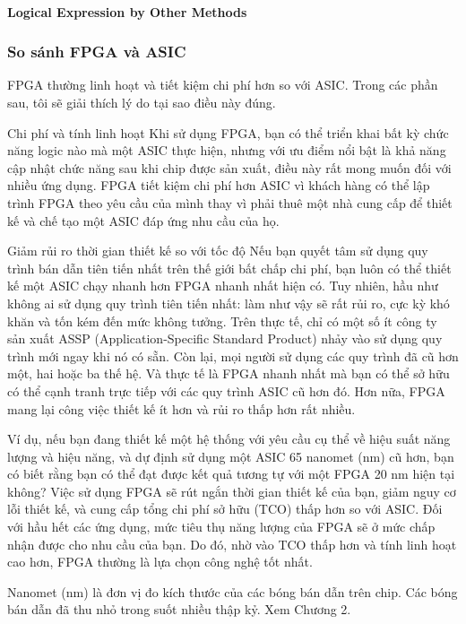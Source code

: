 \documentclass[a4paper]{article}
\begin{document}
\paragraph{Logical Expression by Other Methods}

\subsubsection{So sánh FPGA và ASIC}
FPGA thường linh hoạt và tiết kiệm chi phí hơn so với ASIC. Trong các phần sau, tôi sẽ giải thích lý do tại sao điều này đúng.

Chi phí và tính linh hoạt
Khi sử dụng FPGA, bạn có thể triển khai bất kỳ chức năng logic nào mà một ASIC thực hiện, nhưng với ưu điểm nổi bật là khả năng cập nhật chức năng sau khi chip được sản xuất, điều này rất mong muốn đối với nhiều ứng dụng. FPGA tiết kiệm chi phí hơn ASIC vì khách hàng có thể lập trình FPGA theo yêu cầu của mình thay vì phải thuê một nhà cung cấp để thiết kế và chế tạo một ASIC đáp ứng nhu cầu của họ.

Giảm rủi ro thời gian thiết kế so với tốc độ
Nếu bạn quyết tâm sử dụng quy trình bán dẫn tiên tiến nhất trên thế giới bất chấp chi phí, bạn luôn có thể thiết kế một ASIC chạy nhanh hơn FPGA nhanh nhất hiện có. Tuy nhiên, hầu như không ai sử dụng quy trình tiên tiến nhất: làm như vậy sẽ rất rủi ro, cực kỳ khó khăn và tốn kém đến mức không tưởng. Trên thực tế, chỉ có một số ít công ty sản xuất ASSP (Application-Specific Standard Product) nhảy vào sử dụng quy trình mới ngay khi nó có sẵn. Còn lại, mọi người sử dụng các quy trình đã cũ hơn một, hai hoặc ba thế hệ. Và thực tế là FPGA nhanh nhất mà bạn có thể sở hữu có thể cạnh tranh trực tiếp với các quy trình ASIC cũ hơn đó. Hơn nữa, FPGA mang lại công việc thiết kế ít hơn và rủi ro thấp hơn rất nhiều.

Ví dụ, nếu bạn đang thiết kế một hệ thống với yêu cầu cụ thể về hiệu suất năng lượng và hiệu năng, và dự định sử dụng một ASIC 65 nanomet (nm) cũ hơn, bạn có biết rằng bạn có thể đạt được kết quả tương tự với một FPGA 20 nm hiện tại không? Việc sử dụng FPGA sẽ rút ngắn thời gian thiết kế của bạn, giảm nguy cơ lỗi thiết kế, và cung cấp tổng chi phí sở hữu (TCO) thấp hơn so với ASIC. Đối với hầu hết các ứng dụng, mức tiêu thụ năng lượng của FPGA sẽ ở mức chấp nhận được cho nhu cầu của bạn. Do đó, nhờ vào TCO thấp hơn và tính linh hoạt cao hơn, FPGA thường là lựa chọn công nghệ tốt nhất.

Nanomet (nm) là đơn vị đo kích thước của các bóng bán dẫn trên chip. Các bóng bán dẫn đã thu nhỏ trong suốt nhiều thập kỷ. Xem Chương 2.
\end{document}
